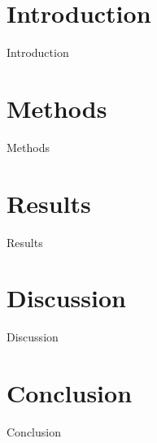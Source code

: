 \documentclass[oneside]{report}
\begin{document}

	\tableofcontents
	\listoffigures
	\listoftables 
	\clearpage
{}
	\begin{abstract}
		{Abstract}
	\end{abstract}

	\chapter{Introduction}
		{Introduction}
	\chapter{Methods}
		{Methods}
	\chapter{Results}
		{Results}
	\chapter{Discussion}
		{Discussion}
	\chapter{Conclusion}
		{Conclusion}
	\clearpage
	
	
\end{document}
